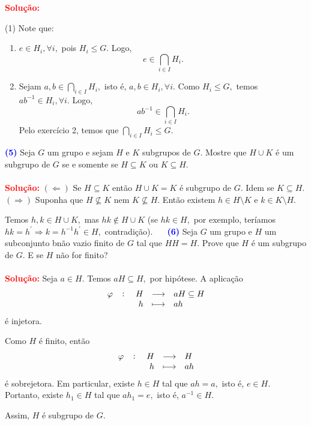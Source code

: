 \documentclass[12pt, a4paper]{article}
\newcommand{\negrito}[1]{\mbox{\boldmath{$#1$}}}
\begin{document}
\textbf{\textcolor{red}{Solução:}} \begin{tasks}[counter-format={(tsk[a])},label-width=3.6ex, label-format = {\bfseries}, column-sep = {0pt}](1)
\task[\textcolor{Floresta}{$\negrito{(a)} $}] Note que:
\begin{enumerate}
    \item $e \in H_i, \forall i,$ pois $H_i \le G.$ Logo, \[e \in \bigcap\limits_{i \in I} H_i.\]
    \item Sejam $a,b \in \bigcap\limits_{i \in I} H_i,$ isto é, $a,b \in H_i, \forall i.$ 
    Como $H_i \le G,$ temos $ab^{-1} \in H_i, \forall i.$ Logo, \[ab^{-1} \in \bigcap\limits_{i \in I} H_i.\]Pelo exercício 2, temos que $\bigcap\limits_{i \in I} H_i \le G.$
\end{enumerate}
\task[\textcolor{Floresta}{$\negrito{(b)} $}] 
\end{tasks}
\textcolor{blue}{\bf(5)}\label{13} Seja $G$ um grupo e sejam $H$ e $K$ subgrupos de $G.$ Mostre que $H \cup K$ é um subgrupo de $G$ se e somente se $H \subseteq K$ ou $K \subseteq H.$\\ \\
\textbf{\textcolor{red}{Solução:}} $(\Leftarrow )$ Se $H \subseteq K$ então $H \cup K = K$ é subgrupo de $G.$ Idem se $K \subseteq H.$\\
$(\Rightarrow)$ Suponha que $H \nsubseteq K$ nem $K \nsubseteq H.$ Então existem $h \in H \setminus K$ e $k \in K \setminus H.$

Temos $h, k \in H \cup K,$ mas $hk \notin H \cup K$ (se $hk \in H,$ por exemplo, teríamos $hk = h^{\prime} \Rightarrow k = h^{-1}h^{\prime} \in H,$ contradição).
\textcolor{white}{Oi}\newline\newline
\textcolor{blue}{\bf(6)}\label{14} Seja $G$ um grupo e $H$ um  subconjunto bnão vazio finito de $G$ tal que $HH = H.$ Prove que $H$ é um subgrupo de $G$. E se $H$ não for finito? \\ \\
\textbf{\textcolor{red}{Solução:}} Seja $a \in H.$ Temos $aH \subseteq H,$ por hipótese. A aplicação
\[
\fullfunction{\varphi}{H}{aH \subseteq H}{h}{ah}
\]
é injetora.

Como $H$ é finito, então
\[
\fullfunction{\varphi}{H}{H}{h}{ah}
\]
é sobrejetora.
Em particular, existe $h \in H$ tal que $ah = a,$ isto é, $e \in H.$ Portanto, existe $h_1 \in H$ tal que $ah_1 = e,$ isto é, $a^{-1} \in H.$

Assim, $H$ é subgrupo de $G.$
\end{document}
